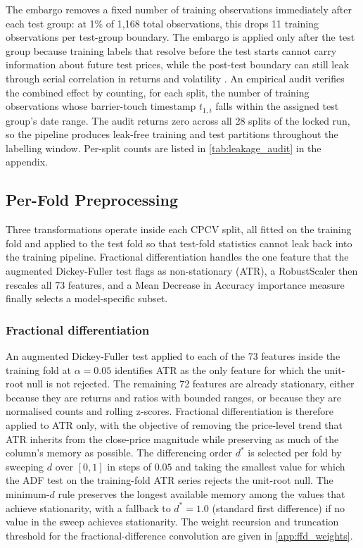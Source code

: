 \documentclass[12pt,a4paper,oneside]{article}
\begin{document}
The embargo removes a fixed number of training observations immediately after each test group: at 1\% of 1,168 total observations, this drops 11 training observations per test-group boundary. The embargo is applied only after the test group because training labels that resolve before the test starts cannot carry information about future test prices, while the post-test boundary can still leak through serial correlation in returns and volatility \citep[Section 7.4.2]{lopez_de_prado_2018}. An empirical audit verifies the combined effect by counting, for each split, the number of training observations whose barrier-touch timestamp $t_{1,i}$ falls within the assigned test group's date range. The audit returns zero across all 28 splits of the locked run, so the pipeline produces leak-free training and test partitions throughout the labelling window. Per-split counts are listed in \label{ref:leakage_audit_call}\autoref{tab:leakage_audit} in the appendix.


\subsection{Per-Fold Preprocessing}\label{subsec:preprocessing}

Three transformations operate inside each CPCV split, all fitted on the training fold and applied to the test fold so that test-fold statistics cannot leak back into the training pipeline. Fractional differentiation handles the one feature that the augmented Dickey-Fuller test flags as non-stationary (ATR), a RobustScaler then rescales all 73 features, and a Mean Decrease in Accuracy importance measure finally selects a model-specific subset.


\subsubsection{Fractional differentiation}\label{subsubsec:ffd}

An augmented Dickey-Fuller test applied to each of the 73 features inside the training fold at $\alpha = 0.05$ identifies ATR as the only feature for which the unit-root null is not rejected. The remaining 72 features are already stationary, either because they are returns and ratios with bounded ranges, or because they are normalised counts and rolling z-scores. Fractional differentiation \citep[Chapter 5]{lopez_de_prado_2018} is therefore applied to ATR only, with the objective of removing the price-level trend that ATR inherits from the close-price magnitude while preserving as much of the column's memory as possible. The differencing order $d^{\ast}$ is selected per fold by sweeping $d$ over $[0, 1]$ in steps of $0.05$ and taking the smallest value for which the ADF test on the training-fold ATR series rejects the unit-root null. The minimum-$d$ rule preserves the longest available memory among the values that achieve stationarity, with a fallback to $d^{\ast} = 1.0$ (standard first difference) if no value in the sweep achieves stationarity. The weight recursion and truncation threshold for the fractional-difference convolution are given in \label{ref:ffd_weights_call}\autoref{app:ffd_weights}.
\end{document}
